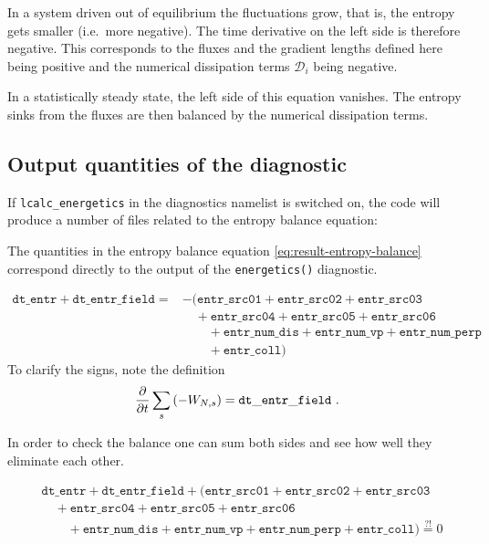 In a system driven out of equilibrium the fluctuations grow, that is,
the entropy gets smaller (i.e.\ more negative). The time derivative on
the left side is therefore negative. This corresponds to the fluxes
and the gradient lengths defined here being positive and the numerical
dissipation terms $\mathcal{D}_i$ being negative.

In a statistically steady state, the left side of this equation
vanishes. The entropy sinks from the fluxes are then balanced by the
numerical dissipation terms.

\subsection{Output quantities of the diagnostic}\label{sec:entr-output}

If \texttt{lcalc_energetics} in the diagnostics namelist is switched
on, the code will produce a number of files related to the entropy
balance equation:

The quantities in the entropy balance equation \ref{eq:result-entropy-balance}
 correspond directly to the output of the \texttt{energetics()} diagnostic.

\begin{align}
   \mathtt{dt\_entr} + \mathtt{dt\_entr\_field} =& -\Big(\mathtt{entr\_src01} + \mathtt{entr\_src02} + \mathtt{entr\_src03} \nonumber\\
& \quad + \mathtt{entr\_src04} + \mathtt{entr\_src05} + \mathtt{entr\_src06}
\nonumber\\
 &\quad\quad + \mathtt{entr\_num\_dis} + \mathtt{entr\_num\_vp} + \mathtt{entr\_num\_perp} \nonumber\\
& \quad\quad + \mathtt{entr\_coll}\Big)
\end{align}
To clarify the signs, note the definition
\begin{align}
  \frac{\partial }{\partial t}\sum_s\left(-W_{N,s}\right) = \mathtt{dt\_entr\_field} \ .
\end{align}

In order to check the balance one can sum both sides and see how well
they eliminate each other.

\begin{align}
&   \mathtt{dt\_entr} + \mathtt{dt\_entr\_field} +\Big(\mathtt{entr\_src01} + \mathtt{entr\_src02} + \mathtt{entr\_src03} \nonumber\\
& \quad + \mathtt{entr\_src04} + \mathtt{entr\_src05} + \mathtt{entr\_src06}
\nonumber\\
 &
\quad\quad + \mathtt{entr\_num\_dis} + \mathtt{entr\_num\_vp} + \mathtt{entr\_num\_perp} + \mathtt{entr\_coll}\Big)
\overset{?!}{=} 0
\end{align}


